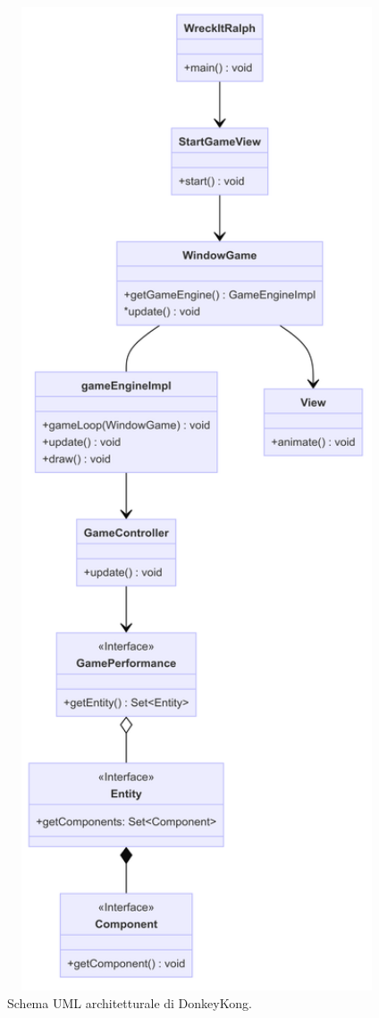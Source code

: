 \documentclass[a4paper,12pt]{report}
\begin{document}
\begin{figure}[H]
\centering{}
\includegraphics[width=1.25\textwidth]{img/architettura.png}
\caption{Schema UML architetturale di DonkeyKong.}
\label{img:architettura}
\end{figure}
\end{document}
